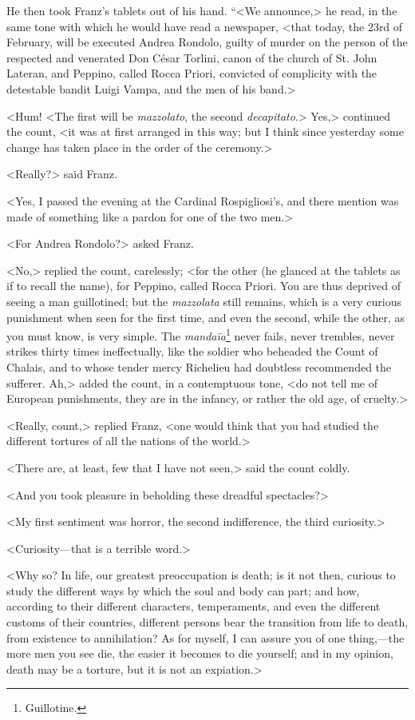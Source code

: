  He then took Franz's tablets out of his hand. “<We announce,> he read, in the same tone with which he would have read a newspaper, <that today, the 23rd of February, will be executed Andrea Rondolo, guilty of murder on the person of the respected and venerated Don César Torlini, canon of the church of St. John Lateran, and Peppino, called Rocca Priori, convicted of complicity with the detestable bandit Luigi Vampa, and the men of his band.> 

 <Hum! <The first will be \textit{mazzolato}, the second \textit{decapitato}.> Yes,> continued the count, <it was at first arranged in this way; but I think since yesterday some change has taken place in the order of the ceremony.> 

 <Really?> said Franz. 

 <Yes, I passed the evening at the Cardinal Rospigliosi's, and there mention was made of something like a pardon for one of the two men.> 

 <For Andrea Rondolo?> asked Franz. 

 <No,> replied the count, carelessly; <for the other (he glanced at the tablets as if to recall the name), for Peppino, called Rocca Priori. You are thus deprived of seeing a man guillotined; but the \textit{mazzolata} still remains, which is a very curious punishment when seen for the first time, and even the second, while the other, as you must know, is very simple. The \textit{mandaïa}\footnote{Guillotine.} never fails, never trembles, never strikes thirty times ineffectually, like the soldier who beheaded the Count of Chalais, and to whose tender mercy Richelieu had doubtless recommended the sufferer. Ah,> added the count, in a contemptuous tone, <do not tell me of European punishments, they are in the infancy, or rather the old age, of cruelty.> 

 <Really, count,> replied Franz, <one would think that you had studied the different tortures of all the nations of the world.> 

 <There are, at least, few that I have not seen,> said the count coldly. 

 <And you took pleasure in beholding these dreadful spectacles?> 

 <My first sentiment was horror, the second indifference, the third curiosity.> 

 <Curiosity—that is a terrible word.> 

 <Why so? In life, our greatest preoccupation is death; is it not then, curious to study the different ways by which the soul and body can part; and how, according to their different characters, temperaments, and even the different customs of their countries, different persons bear the transition from life to death, from existence to annihilation? As for myself, I can assure you of one thing,—the more men you see die, the easier it becomes to die yourself; and in my opinion, death may be a torture, but it is not an expiation.> 

